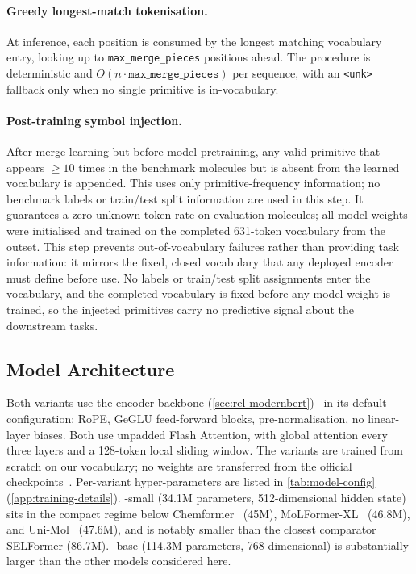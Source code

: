 \documentclass[11pt,a4paper]{article}
\begin{document}
\paragraph{Greedy longest-match tokenisation.}
At inference, each position is consumed by the longest matching vocabulary
entry, looking up to \texttt{max\_merge\_pieces} positions ahead. The procedure
is deterministic and $O(n\cdot\texttt{max\_merge\_pieces})$ per sequence, with
an \texttt{<unk>} fallback only when no single primitive is in-vocabulary.

\paragraph{Post-training symbol injection.}
After merge learning but before model pretraining, any valid \selfies{}
primitive that appears $\ge 10$ times in the benchmark molecules but is absent
from the learned vocabulary is appended. This uses only primitive-frequency
information; no benchmark labels or train/test split information are used in
this step. It guarantees a zero unknown-token rate on evaluation molecules; all
model weights were initialised and trained on the completed 631-token vocabulary
from the outset.
This step prevents out-of-vocabulary failures rather than providing task
information: it mirrors the fixed, closed vocabulary that any deployed encoder
must define before use. No labels or train/test split assignments enter the
vocabulary, and the completed vocabulary is fixed before any model weight is
trained, so the injected primitives carry no predictive signal about the
downstream tasks.

\subsection{Model Architecture}
\label{sec:architecture}

Both \model{} variants use the \modernbert{} encoder backbone
(\cref{sec:rel-modernbert})~\citep{warnerSmarterBetterFaster2024} in its default
configuration: RoPE, GeGLU feed-forward blocks, pre-normalisation, no
linear-layer biases. Both use unpadded Flash Attention, with global attention every three layers
and a 128-token local sliding window. The variants are trained from scratch on
our \selfies{} \ape{} vocabulary; no weights are transferred from the official
\modernbert{} checkpoints~\citep{warnerModernBERTBlog2024}.
Per-variant hyper-parameters are listed in \cref{tab:model-config}
(\cref{app:training-details}).
\model{}-small (34.1M parameters, 512-dimensional hidden state) sits in the
compact regime below Chemformer~\citep{irwinChemformerPretrainedTransformer2022}
(45M), MoLFormer-XL~\citep{rossLargescaleChemicalLanguage2022} (46.8M), and
Uni-Mol~\citep{zhouUniMolUniversal3D2023} (47.6M), and is notably smaller than
the closest \selfies{} comparator SELFormer (86.7M). \model{}-base (114.3M
parameters, 768-dimensional) is substantially larger than the other models considered here.
\end{document}
